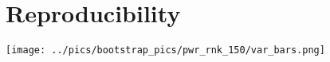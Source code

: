 \documentclass{article}
\begin{document}



\section{Reproducibility}

\texttt{[image: ../pics/bootstrap\_pics/pwr\_rnk\_150/var\_bars.png]}





\end{document}
